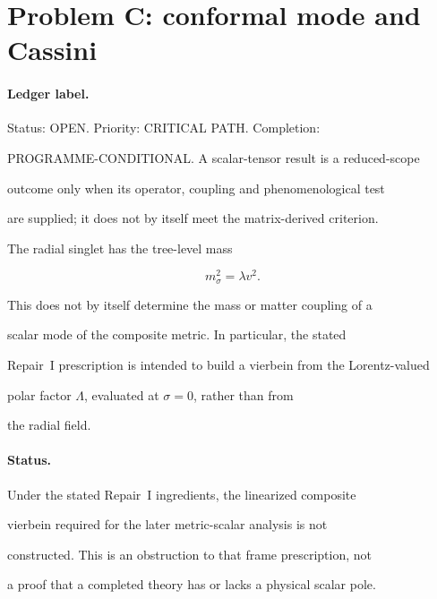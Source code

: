 \section{Problem C: conformal mode and Cassini}

\label{sec:detailed-Problem C: conformal mode and Cassini}



\paragraph{Ledger label.} \label{detail:sec-C-paragraphledgerlabel-10}

Status: OPEN. Priority: CRITICAL PATH. Completion:

PROGRAMME-CONDITIONAL. A scalar-tensor result is a reduced-scope

outcome only when its operator, coupling and phenomenological test

are supplied; it does not by itself meet the matrix-derived criterion.



The radial singlet has the tree-level mass

\[

m_\sigma^2=\lambda v^2.

\]

This does not by itself determine the mass or matter coupling of a

scalar mode of the composite metric. In particular, the stated

Repair~I prescription is intended to build a vierbein from the Lorentz-valued

polar factor \(\Lambda\), evaluated at \(\sigma=0\), rather than from

the radial field.





\paragraph{Status.} \label{detail:sec-C-paragraphstatus-11}

Under the stated Repair~I ingredients, the linearized composite

vierbein required for the later metric-scalar analysis is not

constructed. This is an obstruction to that frame prescription, not

a proof that a completed theory has or lacks a physical scalar pole.

